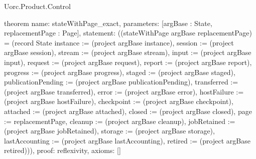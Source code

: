 \begin{lexlean}{Uorc.Product.Control}
\begin{semanticmodule}
theorem{
  name: stateWithPage_exact,
  parameters: [argBase : State, replacementPage : Page],
  statement: ((stateWithPage argBase replacementPage) = (record State {instance := (project argBase instance), session := (project argBase session), stream := (project argBase stream), input := (project argBase input), request := (project argBase request), report := (project argBase report), progress := (project argBase progress), staged := (project argBase staged), publicationPending := (project argBase publicationPending), transferred := (project argBase transferred), error := (project argBase error), hostFailure := (project argBase hostFailure), checkpoint := (project argBase checkpoint), attached := (project argBase attached), closed := (project argBase closed), page := replacementPage, cleanup := (project argBase cleanup), jobRetained := (project argBase jobRetained), storage := (project argBase storage), lastAccounting := (project argBase lastAccounting), retired := (project argBase retired)})),
  proof: reflexivity{},
  axioms: []
}
\end{semanticmodule}
\end{lexlean}
